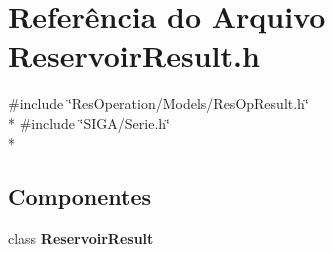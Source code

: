 \section{Referência do Arquivo Reservoir\+Result.\+h}
\label{_models_2_reservoir_2_reservoir_result_8h}
{\ttfamily \#include \char`\"{}Res\+Operation/\+Models/\+Res\+Op\+Result.\+h\char`\"{}}\\*
{\ttfamily \#include \char`\"{}S\+I\+G\+A/\+Serie.\+h\char`\"{}}\\*
\subsection*{Componentes}
\begin{DoxyCompactItemize}
\item 
class {\bf Reservoir\+Result}
\end{DoxyCompactItemize}
